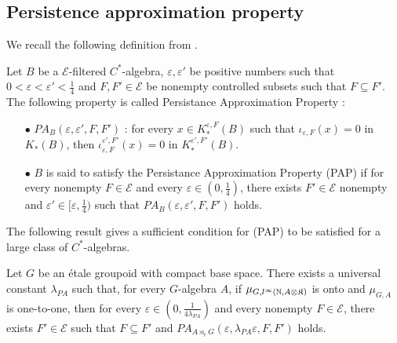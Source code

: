 \subsection{Persistence approximation property}

We recall the following definition from \cite{OY3}.

\begin{definition}
Let $B$ be a $\mathcal E$-filtered $C^*$-algebra, $\varepsilon,\varepsilon'$ be positive numbers such that $0<\varepsilon <\varepsilon' <\frac{1}{4}$ and $F,F'\in\mathcal E$ be nonempty controlled subsets such that $F\subseteq F'$. The following property is called Persistance Approximation Property :
\begin{itemize}
\item[$\bullet$] $PA_B(\varepsilon,\varepsilon',F,F')$ : for every $x\in K_*^{\varepsilon,F}(B)$ such that $\iota_{\varepsilon,F}(x)=0$ in $K_*(B)$, then $\iota_{\varepsilon,F}^{\varepsilon',F'}(x)=0$ in $K_*^{\varepsilon',F'}(B)$.
\item[$\bullet$] $B$ is said to satisfy the Persistance Approximation Property (PAP) if for every nonempty $F\in\mathcal E$ and every $\varepsilon\in (0,\frac{1}{4})$, there exists $F'\in\mathcal E$ nonempty and $\varepsilon'\in [\varepsilon,\frac{1}{4})$ such that $PA_B(\varepsilon,\varepsilon',F,F')$ holds.
\end{itemize}
\end{definition}


The following result gives a sufficient condition for (PAP) to be satisfied for a large class of $C^*$-algebras.

\begin{thm} \label{PAPG}
Let $G$ be an étale groupoid with compact base space. There exists a universal constant $\lambda_{PA}$ such that, for every $G$-algebra $A$, if $\mu_{G,l^\infty(\mathbb N, A\otimes\mathfrak K)}$ is onto and $\mu_{G,A}$ is one-to-one, then for every $\varepsilon \in(0,\frac{1}{4\lambda_{PA}})$ and every nonempty $F\in\mathcal E$, there exists $F'\in\mathcal E$ such that $F\subseteq F'$ and $PA_{A\rtimes_r G}(\varepsilon,\lambda_{PA}\varepsilon,F,F')$ holds.
\end{thm}

